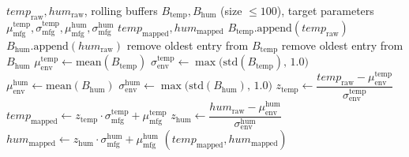 \begin{appendices}
\begin{algorithm}[H]
\small
\caption{Sensor Alignment via Z-score Distribution Mapping}
\label{alg:sensor_aligner}
\begin{algorithmic}[1]
\Require $temp_{\text{raw}}, hum_{\text{raw}}$, rolling buffers $B_{\text{temp}}, B_{\text{hum}}$ (size $\leq 100$),
target parameters $\mu_{\text{mfg}}^{\text{temp}}, \sigma_{\text{mfg}}^{\text{temp}}, \mu_{\text{mfg}}^{\text{hum}}, \sigma_{\text{mfg}}^{\text{hum}}$
\Ensure $temp_{\text{mapped}}, hum_{\text{mapped}}$
\State $B_{\text{temp}}.\text{append}(temp_{\text{raw}})$
\State $B_{\text{hum}}.\text{append}(hum_{\text{raw}})$
    \State remove oldest entry from $B_{\text{temp}}$
    \State remove oldest entry from $B_{\text{hum}}$
\EndIf
\State $\mu_{\text{env}}^{\text{temp}} \gets \mathrm{mean}(B_{\text{temp}})$
\State $\sigma_{\text{env}}^{\text{temp}} \gets \max\bigl(\mathrm{std}(B_{\text{temp}}),\, 1.0\bigr)$ 
\State $\mu_{\text{env}}^{\text{hum}} \gets \mathrm{mean}(B_{\text{hum}})$
\State $\sigma_{\text{env}}^{\text{hum}} \gets \max\bigl(\mathrm{std}(B_{\text{hum}}),\, 1.0\bigr)$
\State $z_{\text{temp}} \gets \dfrac{temp_{\text{raw}} - \mu_{\text{env}}^{\text{temp}}}{\sigma_{\text{env}}^{\text{temp}}}$
\State $temp_{\text{mapped}} \gets z_{\text{temp}} \cdot \sigma_{\text{mfg}}^{\text{temp}} + \mu_{\text{mfg}}^{\text{temp}}$
\State $z_{\text{hum}} \gets \dfrac{hum_{\text{raw}} - \mu_{\text{env}}^{\text{hum}}}{\sigma_{\text{env}}^{\text{hum}}}$
\State $hum_{\text{mapped}} \gets z_{\text{hum}} \cdot \sigma_{\text{mfg}}^{\text{hum}} + \mu_{\text{mfg}}^{\text{hum}}$
\State \Return $(temp_{\text{mapped}}, hum_{\text{mapped}})$
\end{algorithmic}
\end{algorithm}


\end{appendices}
